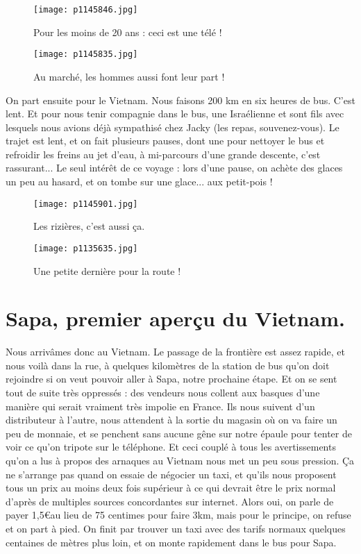 \documentclass{book}
\begin{document}
\begin{figure}[h]
\centering
\texttt{[image: p1145846.jpg]}
\caption*{Pour les moins de 20 ans : ceci est une télé !}
\end{figure}


\begin{figure}[h]
\centering
\texttt{[image: p1145835.jpg]}
\caption*{Au marché, les hommes aussi font leur part !}
\end{figure}

On part ensuite pour le Vietnam. Nous faisons 200 km en six heures de bus. C'est lent. Et pour nous tenir compagnie dans le bus, une Israélienne et sont fils avec lesquels nous avions déjà sympathisé chez Jacky (les repas, souvenez-vous). Le trajet est lent, et on fait plusieurs pauses, dont une pour nettoyer le bus et refroidir les freins au jet d'eau, à mi-parcours d'une grande descente, c'est rassurant... Le seul intérêt de ce voyage : lors d'une pause, on achète des glaces un peu au hasard, et on tombe sur une glace... aux petit-pois !


\begin{figure}[h]
\centering
\texttt{[image: p1145901.jpg]}
\caption*{Les rizières, c'est aussi ça.}
\end{figure}


\begin{figure}[h]
\centering
\texttt{[image: p1135635.jpg]}
\caption*{Une petite dernière pour la route !}
\end{figure}



\chapter{Sapa, premier aperçu du Vietnam.}
Nous arrivâmes donc au Vietnam. Le passage de la frontière est assez rapide, et nous voilà dans la rue, à quelques kilomètres de la station de bus qu'on doit rejoindre si on veut pouvoir aller à Sapa, notre prochaine étape. Et on se sent tout de suite très oppressés : des vendeurs nous collent aux basques d'une manière qui serait vraiment très impolie en France. Ils nous suivent d'un distributeur à l'autre, nous attendent à la sortie du magasin où on va faire un peu de monnaie, et se penchent sans aucune gêne sur notre épaule pour tenter de voir ce qu'on tripote sur le téléphone. Et ceci couplé à tous les avertissements qu'on a lus à propos des arnaques au Vietnam nous met un peu sous pression. Ça ne s'arrange pas quand on essaie de négocier un taxi, et qu'ils nous proposent tous un prix au moins deux fois supérieur à ce qui devrait être le prix normal d'après de multiples sources concordantes sur internet. Alors oui, on parle de payer 1,5\euro au lieu de 75 centimes pour faire 3km, mais pour le principe, on refuse et on part à pied. On finit par trouver un taxi avec des tarifs normaux quelques centaines de mètres plus loin, et on monte rapidement dans le bus pour Sapa.
\end{document}
